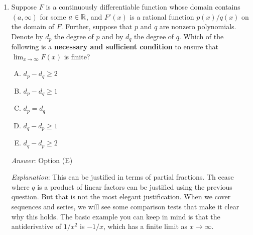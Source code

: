 \documentclass[10pt]{amsart}
\begin{document}
\begin{enumerate}
  \begin{enumerate}[(A)]
  \item $\{ -\pi, -e, 1/e,1/\pi \}$
  \item $\{ -\pi/2, -\sqrt{3}/2, 11/17,\pi^2/6 \}$
  \item $\{ -\pi^3/7,-\pi^2/6,\sqrt{13},11/2 \}$
  \item Knowing $F$ at any of the above determines the value of $F$
    uniquely.
  \item None of the above works to uniquely determine the value of
    $F$.
  \end{enumerate}

  {\em Answer}: Option (B)

  {\em Explanation}: The domain of $F$ has four connected components:
  the open intervals $(-\infty,-1)$, $(-1,0)$, $(0,1)$, and
  $(1,\infty)$. We need to know the value of $F$ at one point in each
  of these intervals. By computing values, we see that the set of
  points in option (B) has the property that it contains one point in
  each of these intervals, and those in options (A) and (C) do not.

  {\em Performance review}: $17$ out of $25$ people got this. $4$
  chose (A), $2$ chose (E), $1$ each chose (C) and (D).

  {\em Historical note (last time)}: $8$ out of $18$ people got this
  correct. $5$ chose (D), $3$ chose (A), $2$ left the question blank.

\item Suppose $F$ is a continuously differentiable function whose
  domain contains $(a,\infty)$ for some $a \in \mathbb{R}$, and $F'(x)$ is a
  rational function $p(x)/q(x)$ on the domain of $F$. Further, suppose
  that $p$ and $q$ are nonzero polynomials. Denote by $d_p$ the degree
  of $p$ and by $d_q$ the degree of $q$. Which of the following is a
  {\bf necessary and sufficient condition} to ensure that $\lim_{x \to
  \infty} F(x)$ is finite?

  \begin{enumerate}[(A)]
  \item $d_p - d_q \ge 2$
  \item $d_p - d_q \ge 1$
  \item $d_p = d_q$
  \item $d_q - d_p \ge 1$
  \item $d_q - d_p \ge 2$
  \end{enumerate}

  {\em Answer}: Option (E)

  {\em Explanation}: This can be justified in terms of partial
  fractions. Th ecase where $q$ is a product of linear factors can be
  justified using the previous question. But that is not the most
  elegant justification. When we cover sequences and series, we will
  see some comparison tests that make it clear why this holds. The
  basic example you can keep in mind is that the antiderivative of
  $1/x^2$ is $-1/x$, which has a finite limit as $x \to \infty$.


\end{enumerate}
\end{document}
